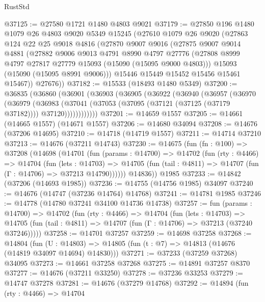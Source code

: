 \begin{lexlean}{RustStd}
\begin{coremodule}
@37125 := @27580 @1721 @1480 @4803 @9021
@37179 := @27850
    @196
    @1480
    @1079
    @26
    @4803
    @9020
    @5349
    @15245
    (@27610
      @1079
      @26
      @9020
      (@27863
        @124
        @22
        @25
        @9018
        @4816
        (@27870
          @9007
          @9016
          (@27875
            @9007
            @9014
            @4881
            (@27882
              @9006
              @9013
              @4791
              @8990
              @4797
              @27776
              (@27808 @8999 @4797 @27817 @27779 @15093 (@15090 (@15095 @9000 @4803)))
              @15093
              (@15090 (@15095 @8991 @9006)))
            @15446
            @15449
            @15452
            @15456
            @15461
            @15467))
        @27676))
@37182 := @15533 (@18493 @1480 @5349)
@37200 := @36835
    (@36860
      (@36901
        (@36903
          (@36905
            (@36922
              (@36940
                (@36957
                  (@36970
                    (@36979
                      (@36983
                        (@37041
                          (@37053 (@37095 (@37121 (@37125 (@37179 @37182)))) @37120))))))))))))
@37201 := @14659 @1557
@37205 := @14661 (@14665 @1557) (@14671 @1557)
@37206 := @14680 @34094
@37208 := @14676 (@37206 @14695)
@37210 := @14718 (@14719 @1557)
@37211 := @14714 @37210
@37213 := @14676 (@37211 @14743)
@37230 := @14675
    (fun (fn : @100) =>
    @37208
      (@14698
        (@14701
          (fun (params : @14700) =>
          @14702
            (fun (rty : @4466) =>
            @14704
              (fun (lets : @14703) =>
              @14705 (fun (tail : @4811) => @14707 (fun (Γ : @14706) => @37213 @14790))))))
        @14836))
    @1985
@37233 := @14842 (@37206 (@14693 @1985))
@37236 := @14755 (@14756 @1985) @34097
@37240 := @14676 (@14747 (@37236 @14764) @14768)
@37241 := @14781 @1985
@37246 := @14778 (@14780 @37241 @34100 @14736 @14738)
@37257 := fun (params : @14700) =>
  @14702
    (fun (rty : @4466) =>
    @14704
      (fun (lets : @14703) =>
      @14705 (fun (tail : @4811) => @14707 (fun (Γ : @14706) => @37213 (@37240 @37246)))))
@37258 := @14701 @37257
@37259 := @14698 @37258
@37268 := @14804
    (fun (U : @14803) => @14805 (fun (t : @7) => @14813 (@14676 (@14819 @34097 @14694) @14830)))
@37271 := @37233 (@37259 @37268) @34095
@37273 := @14661 @37258 @37268
@37275 := @14891 @37257 @8370
@37277 := @14676 (@37211 @33250)
@37278 := @37236 @33253
@37279 := @14747 @37278
@37281 := @14676 (@37279 @14768)
@37292 := @14894
    (fun (rty : @4466) =>
    @14704

\end{coremodule}
\end{lexlean}
